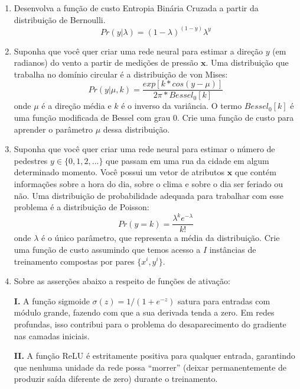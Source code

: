 \documentclass{dlproblemset}
\begin{document}
\begin{enumerate}[1)]
    \item Desenvolva a função de custo Entropia Binária Cruzada a partir da distribuição de Bernoulli.
    \begin{equation*}
        Pr(y|\lambda)= (1-\lambda)^{(1-y)}\lambda^y
    \end{equation*}

    \item {} Suponha que você quer criar uma rede neural para estimar a direção $y$ (em radianos) do vento a partir de medições de pressão $\mathbf{x}$.
    Uma distribuição que trabalha no domínio circular é a distribuição de von Mises:
    \begin{equation*}
        Pr(y|\mu,k) = \frac{exp[k*cos(y-\mu)]}{2\pi * Bessel_0[k]}
    \end{equation*}
    \noindent onde $\mu$ é a direção média e $k$ é o inverso da variância. O termo $Bessel_0[k]$ é uma função modificada de Bessel com grau 0.
    Crie uma função de custo para aprender o parâmetro $\mu$ dessa distribuição.

    \item {} Suponha que você quer criar uma rede neural para estimar o número de pedestres $y \in \{0,1,2,...\}$ que passam em uma rua da cidade em algum determinado momento. Você possui um vetor de atributos $\mathbf{x}$ que contém informações sobre a hora do dia, sobre o clima e sobre o dia ser feriado ou não.
    Uma distribuição de probabilidade adequada para trabalhar com esse problema é a distribuição de Poisson:
    \begin{equation*}
        Pr(y=k) = \frac{\lambda^ke^{-\lambda}}{k!}
    \end{equation*}
    \noindent onde $\lambda$ é o único parâmetro, que representa a média da distribuição.
    Crie uma função de custo assumindo que temos acesso a $I$ instâncias de treinamento compostas por pares $\{x^{i},y^{i}\}$.

    \item Sobre as asserções abaixo a respeito de funções de ativação:

    \textbf{I.} A função sigmoide $\sigma(z) = 1/(1 + e^{-z})$ satura para entradas com módulo grande, fazendo com que a sua derivada tenda a zero. Em redes profundas, isso contribui para o problema do desaparecimento do gradiente nas camadas iniciais.

    \textbf{II.} A função ReLU é estritamente positiva para qualquer entrada, garantindo que nenhuma unidade da rede possa ``morrer'' (deixar permanentemente de produzir saída diferente de zero) durante o treinamento.


\end{enumerate}
\end{document}
